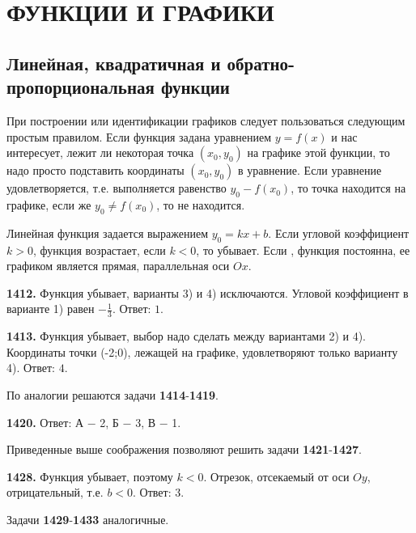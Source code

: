 \section{ФУНКЦИИ И ГРАФИКИ}
\subsection{Линейная, квадратичная и обратно- пропорциональная функции}


При построении или идентификации графиков следует пользоваться следующим простым правилом. Если  функция задана \newline уравнением $y=f(x)$ и нас интересует, лежит ли некоторая точка $\left(x_0,y_0\right)$ на графике этой функции, то надо просто подставить координаты $\left(x_0,y_0\right)$ в уравнение. Если уравнение удовлетворяется, т.е. выполняется равенство $y_0-f(x_0)$, то точка находится на графике, если же $y_0\neq f(x_0)$, то не находится.

Линейная функция задается выражением $y_0=kx+b$. Если угловой коэффициент $k>0$, функция возрастает, если $k<0$, то убывает. Если , функция постоянна, ее графиком является прямая, параллельная оси $Ox$.

\textbf{1412.}  Функция убывает, варианты 3) и 4) исключаются. Угловой коэффициент в варианте 1) равен $-\frac{1}{3}$. \newline \null \hspace*{\fill} Ответ: $1$.   

\textbf{1413.}  Функция убывает, выбор надо сделать между вариантами 2) и 4). Координаты точки (-2;0), лежащей на графике, удовлетворяют только варианту 4). \newline \null \hspace*{\fill} Ответ: $4$. 

По аналогии решаются задачи \textbf{1414}-\textbf{1419}.

\textbf{1420.} \newline \null \hspace*{\fill} Ответ: А $-$ 2, Б $-$ 3, В $-$ 1.

Приведенные выше соображения позволяют решить задачи \newline \textbf{1421}-\textbf{1427}.

\textbf{1428.}  Функция убывает, поэтому $k<0$. Отрезок, отсекаемый от оси $Oy$, отрицательный, т.е. $b<0$. \newline \null \hspace*{\fill} Ответ: $3$. 

Задачи \textbf{1429}-\textbf{1433}  аналогичные.

